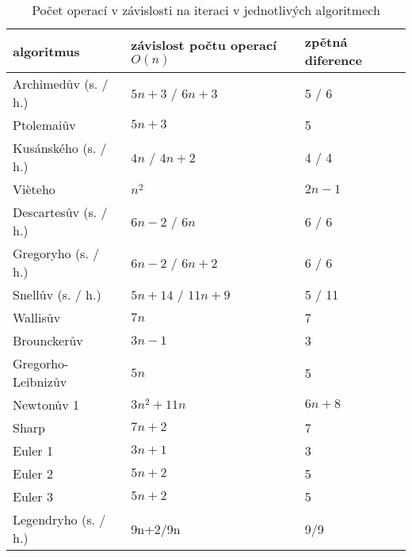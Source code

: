 \documentclass[soc]{gzwroc} %
\begin{document}
\begin{table}[h!]
\caption{Počet operací v závislosti na iteraci v jednotlivých algoritmech}
\begin{tabular}{|l||l|l|}
\hline
\bfseries{algoritmus} & \bfseries{závislost počtu operací $O(n)$} & \bfseries{zpětná diference} \\ \hline \hline
Archimedův (s. / h.) & $5n+3$ / $6n+3$      & 5 / 6   \\ \hline
Ptolemaiův & $5n+3$      & 5   \\ \hline
Kusánského (s. / h.) & $4n$ / $4n+2$      & 4 / 4   \\ \hline  
Vièteho & $n^2$      & $2n-1$   \\ \hline
Descartesův (s. / h.) & $6n-2$ / $6n$      & 6 / 6   \\ \hline
Gregoryho (s. / h.) & $6n-2$ / $6n+2$      & 6 / 6   \\ \hline
Snellův (s. / h.) & $5n+14$ / $11n+9$      & 5 / 11   \\ \hline
Wallisův & $7n$    & 7   \\ \hline
Brounckerův & $3n-1$    & 3   \\ \hline
Gregorho-Leibnizův & $5n$      & 5  \\ \hline
Newtonův 1 & $3n^2+11n$      & $6n+8$ \\ \hline
Sharp & $7n+2$      & 7  \\ \hline
Euler 1 & $3n+1$      & 3  \\ \hline
Euler 2 & $5n+2$      & 5 \\ \hline
Euler 3 & $5n+2$      & 5  \\ \hline
Legendryho (s. / h.) &  9n+2/9n &  9/9 \\ \hline
\end{tabular}
\end{table}
\end{document}
